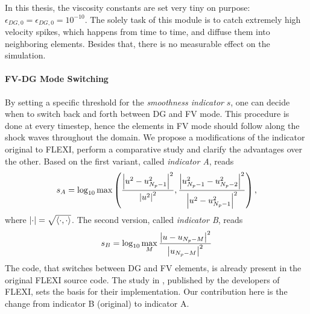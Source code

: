 In this thesis, the viscosity constants are set very tiny on purpose:
$\epsilon_{DG,0} = \epsilon_{DG,0} = 10^{-10}$. The solely task of this module
is to catch extremely high velocity spikes, which happens from time to time,
and diffuse them into neighboring elements. Besides that, there is no measurable
effect on the simulation.

\paragraph{FV-DG Mode Switching}
By setting a specific threshold for the \emph{smoothness indicator} $s$, one
can decide when to switch back and forth between DG and FV mode. This procedure
is done at every timestep, hence the elements in FV mode should follow along
the shock waves throughout the domain.  We propose a modifications of the
indicator original to FLEXI, perform a comparative study and clarify the
advantages over the other.  Based on  the first
variant, called \emph{indicator
A}, reads
\begin{equation}
\label{eqn:indicator-A}
    s_A = \log_{10} \max \left(
        \frac{\left|u^2 - u_{N_p-1}^2\right|^2}{\left|u^2\right|^2},
        \frac{\left|u_{N_p-1}^2 - u_{N_p-2}^2\right|^2}{\left|u^2 - u_{N_p-1}^2\right|^2}
    \right),
\end{equation}
where $\left|\cdot\right| = \sqrt{\left\langle\cdot,\cdot\right\rangle}$.  The second version, called
\emph{indicator B}, reads
\begin{equation}
\label{eqn:indicator-B}
    s_B = \log_{10} \max_M \frac{\left|u - u_{N_p-M}\right|^2}{\left|u_{N_p-M}\right|^2}
\end{equation}
The code, that switches between DG and FV elements, is already present in the
original FLEXI source code. The study in \cite{balsara2007sub}, published by
the developers of FLEXI, sets the basis for their implementation. Our
contribution here is the change from indicator B (original) to indicator A.

